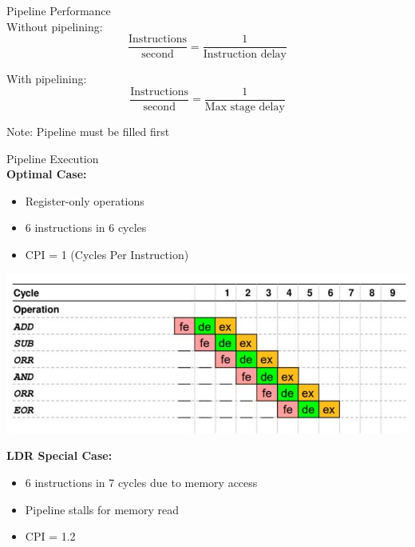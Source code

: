 \begin{definition}{Pipeline Performance}\\
Without pipelining:
\[\frac{\text{Instructions}}{\text{second}} = \frac{1}{\text{Instruction delay}}\]

With pipelining:
\[\frac{\text{Instructions}}{\text{second}} = \frac{1}{\text{Max stage delay}}\]

Note: Pipeline must be filled first
\end{definition}

\begin{example2}{Pipeline Execution}\\
\textbf{Optimal Case:}
\begin{itemize}
  \item Register-only operations
  \item 6 instructions in 6 cycles
  \item CPI = 1 (Cycles Per Instruction)
\end{itemize}

\includegraphics[width=\linewidth]{images/2024_12_29_79e6b22f503fb7b4f718g-14}

\textbf{LDR Special Case:}
\begin{itemize}
  \item 6 instructions in 7 cycles due to memory access
  \item Pipeline stalls for memory read
  \item CPI = 1.2
\end{itemize}
\end{example2}

